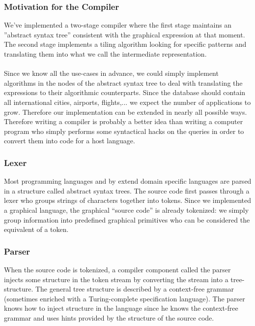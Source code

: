 \subsubsection{Motivation for the Compiler}
\label{sssection:motivation_for_the_compiler}
We've implemented a two-stage compiler where the first stage maintains an
''abstract syntax tree'' consistent with the graphical expression at that
moment. The second stage implements a tiling algorithm looking for specific
patterns and translating them into what we call the intermediate representation.
\paragraph{}
Since we know all the use-cases in advance, we could simply implement
algorithms in the nodes of the abstract syntax tree to deal with translating
the expressions to their algorithmic counterparts. Since the database should
contain all international cities, airports, flights,... we expect the number of
applications to grow. Therefore our implementation can be extended in nearly
all possible ways. Therefore writing a compiler is probably a better idea than
writing a computer program who simply performs some syntactical hacks on the
queries in order to convert them into code for a host language.
\subsubsection{Lexer}
Most programming languages and by extend domain specific languages are parsed
in a structure called abstract syntax trees. The source code first passes
through a lexer who groups strings of characters together into tokens. Since we
implemented a graphical language, the graphical ``source code'' is already
tokenized: we simply group information into predefined graphical primitives who
can be considered the equivalent of a token.
\subsubsection{Parser}
When the source code is tokenized, a compiler component called the parser
injects some structure in the token stream by converting the stream into a
tree-structure. The general tree structure is described by a context-free
grammar (sometimes enriched with a Turing-complete specification language). The
parser knows how to inject structure in the language since he knows the
context-free grammar and uses hints provided by the structure of the source
code.
